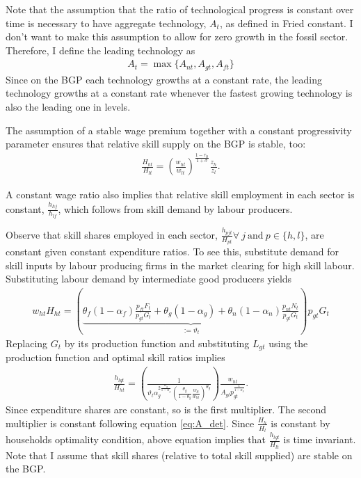 Note that the assumption that the ratio of technological progress is constant over time is necessary to have aggregate technology, $A_t$, as defined in Fried constant. I don't want to make this assumption to allow for zero growth in the fossil sector. Therefore, I define the leading technology as 
\begin{align}
A_t= \max\{A_{nt}, A_{gt}, A_{ft}\}
\end{align}
Since on the BGP each technology growths at a constant rate, the leading technology growths at a constant rate  whenever the fastest growing technology is also the leading one in levels.

The assumption of a stable wage premium together with a constant progressivity parameter ensures that relative skill supply on the BGP is stable, too: 
\begin{align}
\frac{H_{ht}}{H_{lt}}=\left(\frac{w_{ht}}{w_{lt}}\right)^\frac{1-\tau_{lt}}{1+\sigma}\frac{z_h}{z_l}.
\end{align}

A constant wage ratio also implies that relative skill employment in each sector is constant, $\frac{h_{hj}}{h_{lf}}$, which follows from skill demand by labour producers. 


Observe that skill shares employed in each sector, $\frac{h_{pjt}}{H_{pt}} \forall \ j\ \text{and} \ p\in\{h,l\}$, are constant given constant expenditure ratios. 
To see this, substitute demand for skill inputs by labour producing firms in the market clearing for high skill labour. Substituting labour demand by intermediate good producers yields
\begin{align}
w_{ht}H_{ht}= \left(\underbrace{\theta_f (1-\alpha_f)\frac{p_{ft}F_t}{p_{gt}G_t}+\theta_{g}(1-\alpha_g)+\theta_n(1-\alpha_n)\frac{p_{nt}N_t}{p_{gt}G_t}}_{:=\vartheta_t}\right)p_{gt}G_t
\end{align}
Replacing $G_t$ by its production function and substituting $L_{gt}$ using the production function and optimal skill ratios implies
\begin{align}
\frac{h_{lgt}}{H_{ht}}=\left(\frac{1}{\vartheta_t\alpha_g^{2\frac{\alpha_g}{1-\alpha_g}}\left(\frac{\theta_g}{1-\theta_g}\frac{w_{lt}}{w_{ht}}\right)^{\theta_{g}}}\right)\frac{w_{ht}}{A_{gt}p_{gt}^\frac{1}{1-\alpha_g}}.
\end{align}
Since expenditure shares are constant, so is the first multiplier. The second multiplier is constant following equation \ref{eq:A_det}. Since $\frac{H_h}{H_l}$ is constant by households optimality condition, above equation implies that $\frac{h_{lgt}}{H_{lt}}$ is time invariant. Note that I assume that skill shares (relative to total skill supplied) are stable on the BGP. 
